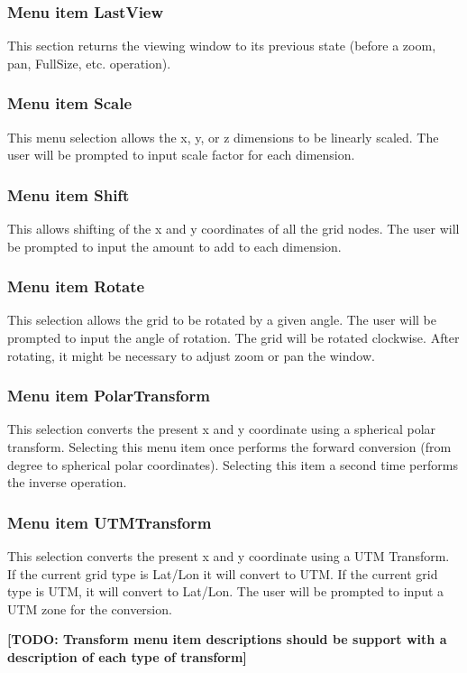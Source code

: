 \documentclass{article}
\begin{document}
\subsubsection{Menu item LastView}
This section returns the viewing window to its previous state (before a zoom, pan, FullSize, etc. operation).

\subsubsection{Menu item Scale}
This menu selection allows the x, y, or z dimensions to be linearly scaled. The user will be prompted to input scale factor for each dimension. 

\subsubsection[Menu item Shift]{Menu item Shift}
This allows shifting of the x and y coordinates of all the grid nodes. The user will be prompted to input the amount to add to each dimension.

\subsubsection{Menu item Rotate}
This selection allows the grid to be rotated by a given angle. The user will be prompted to input the angle of rotation. The grid will be rotated clockwise. After rotating, it might be necessary to adjust zoom or pan the window. 

\subsubsection{Menu item PolarTransform}
This selection converts the present x and y coordinate using a spherical polar transform.  Selecting this menu item once performs the forward conversion (from degree to spherical polar coordinates).  Selecting this item a second time performs the inverse operation.

\subsubsection{Menu item UTMTransform}
This selection converts the present x and y coordinate using a UTM Transform. If the current grid type is Lat/Lon it will convert to UTM. If the current grid type is UTM, it will convert to Lat/Lon. The user will be prompted to input a UTM zone for the conversion.

\textbf{[TODO: Transform menu item descriptions should be support with a description of each type of transform]}
\end{document}
